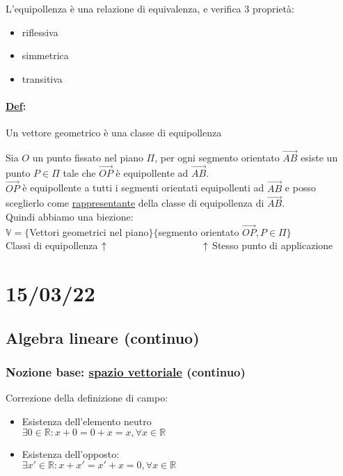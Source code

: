 \documentclass{article}
\newcommand{\ul}[1]{\underline{#1}}
\newcommand{\R}{\mathbb{R}}
\newcommand{\V}{\mathbb{V}}
\newcommand{\Def}[2]{\paragraph{\ul{Def}:}#1\\\hspace*{3em}\begin{minipage}{.8\textwidth}#2\end{minipage}}
\begin{document}
\vspace*{2em}
L'equipollenza è una relazione di equivalenza, e verifica 3 proprietà:
\begin{itemize}
	\item riflessiva
	\item simmetrica
	\item transitiva
\end{itemize}
\Def{Un vettore geometrico è una classe di equipollenza}
{Sia $O$ un punto fissato nel piano $\Pi$, per ogni segmento orientato $\vec{AB}$ esiste un punto $P\in\Pi$ tale che $\vec{OP}$ è equipollente ad $\vec{AB}$.\\
	$\vec{OP}$ è equipollente a tutti i segmenti orientati equipollenti ad $\vec{AB}$ e posso sceglierlo come \ul{rappresentante} della classe di equipollenza di $\vec{AB}$.\\
	Quindi abbiamo una biezione:\\
	$\V=\{$Vettori geometrici nel piano$\}\{$segmento orientato $\vec{OP},P\in\Pi\}$\\
	Classi di equipollenza $\uparrow\hspace*{10em}\uparrow$ Stesso punto di applicazione}
\section{15/03/22}
\subsection{Algebra lineare (continuo)}
\subsubsection*{Nozione base: \ul{spazio vettoriale} (continuo)}
Correzione della definizione di campo:
\begin{itemize}
	\item Esistenza dell'elemento neutro\\$\exists0\in\R:x+0=0+x=x,\forall x\in\R$
	\item Esistenza dell'opposto:\\$\exists x'\in\R:x+x'=x'+x=0,\forall x\in\R$
\end{itemize}
\hrulefill
\end{document}
